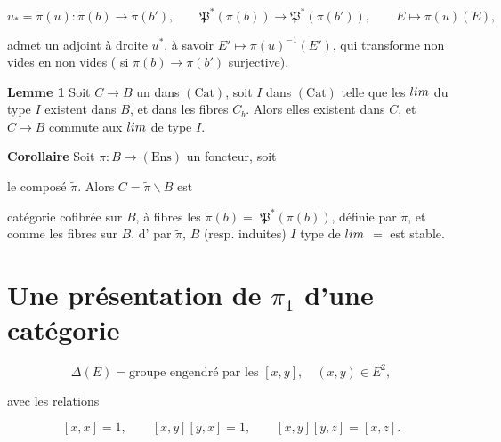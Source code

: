 \documentclass[11pt,a4paper]{article}
\begin{document}
\[
  u_{*} = \widetilde{\pi}(u) : \widetilde{\pi}(b) \longrightarrow
  \widetilde{\pi}(b'),
  \qquad
  \mathfrak{P}^{*}(\pi(b)) \longrightarrow \mathfrak{P}^{*}(\pi(b')),
  \qquad E \longmapsto \pi(u)(E),
\]


admet un adjoint à droite $u^{*}$, à savoir
$E' \longmapsto \pi(u)^{-1}(E')$, qui transforme \ill{} non vides en non vides
( \ill{} si $\pi(b) \longrightarrow \pi(b')$ surjective).

\textbf{Lemme 1} Soit $C \longrightarrow B$ un  \ill{} dans
$(\mathrm{Cat})$,  soit $I$ dans $(\mathrm{Cat})$ telle que les
$\varprojlim$ du type $I$ existent dans $B$, et dans les fibres $C_{b}$. Alors
elles existent dans $C$, et $C \longrightarrow B$ commute aux $\varprojlim$ de
type $I$.

\textbf{Corollaire} Soit $\pi : B \longrightarrow (\mathrm{Ens})$ un foncteur,
\struck{\ill{}} soit


le composé $\widetilde{\pi}$. Alors $C = \widetilde{\pi}\backslash B$ est \ill{}


\ill{} catégorie cofibrée sur $B$, à fibres les
$\widetilde{\pi}(b) = {}$ $\mathfrak{P}^{*}(\pi(b))$,
définie par $\widetilde{\pi}$, et \ill{} comme les fibres sur $B$,
\ill{} d' par $\widetilde{\pi}$, \ill{} $B$ \ill{}
(resp. induites) \ill{} $I$  \ill{} type de $\varprojlim$
\struck{\ill{}} $=$ est stable.

\section*{Une présentation de $\pi_{1}$ d'une catégorie}


\[
  \Delta(E) = \text{groupe engendré par les } [x,y], \quad (x,y) \in E^{2},
\]

avec les relations

\[
  [x,x] = 1, \qquad [x,y][y,x] = 1, \qquad [x,y][y,z] = [x,z].
\]
\end{document}
